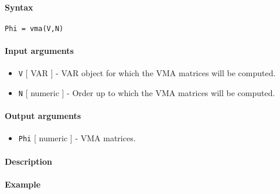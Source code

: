 


	\paragraph{Syntax}

\begin{verbatim}
Phi = vma(V,N)
\end{verbatim}

\paragraph{Input arguments}

\begin{itemize}
\item
  \texttt{V} {[} VAR {]} - VAR object for which the VMA matrices will be
  computed.
\item
  \texttt{N} {[} numeric {]} - Order up to which the VMA matrices will
  be computed.
\end{itemize}

\paragraph{Output arguments}

\begin{itemize}
\itemsep1pt\parskip0pt
\item
  \texttt{Phi} {[} numeric {]} - VMA matrices.
\end{itemize}

\paragraph{Description}

\paragraph{Example}



